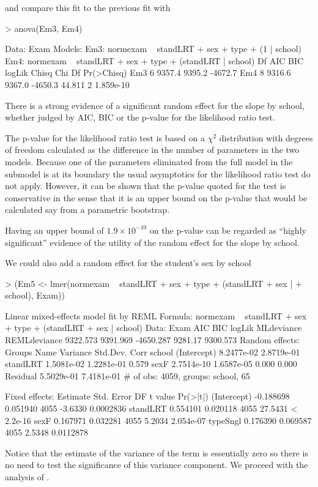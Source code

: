 \documentclass[12pt]{article}
\begin{document}
and compare this fit to the previous fit with
\begin{Schunk}
\begin{Sinput}
> anova(Em3, Em4)
\end{Sinput}
\begin{Soutput}
Data: Exam
Models:
Em3: normexam ~ standLRT + sex + type + (1 | school)
Em4: normexam ~ standLRT + sex + type + (standLRT | school)
    Df     AIC     BIC  logLik  Chisq Chi Df Pr(>Chisq)
Em3  6  9357.4  9395.2 -4672.7                         
Em4  8  9316.6  9367.0 -4650.3 44.811      2  1.859e-10
\end{Soutput}
\end{Schunk}
There is a strong evidence of a significant random effect for the
slope by school, whether judged by AIC, BIC or the p-value for the
likelihood ratio test.

The p-value for the likelihood ratio test is based on a $\chi^2$ distribution
with degrees of freedom calculated as the difference in the number of
parameters in the two models.  Because one of the parameters
eliminated from the full model in the submodel is at its boundary the
usual asymptotics for the likelihood ratio test do not apply.
However, it can be shown that the p-value quoted for the test is
conservative in the sense that it is an upper bound on the 
p-value that would be calculated say from a parametric bootstrap.

Having an upper bound of $1.9\times 10^{-10}$ on the p-value can be
regarded as ``highly significant'' evidence of the utility of the
random effect for the slope by school.

We could also add a random effect for the student's sex by school
\begin{Schunk}
\begin{Sinput}
> (Em5 <- lmer(normexam ~ standLRT + sex + type + (standLRT + sex | 
+     school), Exam))
\end{Sinput}
\begin{Soutput}
Linear mixed-effects model fit by REML
Formula: normexam ~ standLRT + sex + type + (standLRT + sex | school) 
   Data: Exam 
      AIC      BIC    logLik MLdeviance REMLdeviance
 9322.573 9391.969 -4650.287    9281.17     9300.573
Random effects:
 Groups   Name        Variance   Std.Dev.   Corr        
 school   (Intercept) 8.2477e-02 2.8719e-01             
          standLRT    1.5081e-02 1.2281e-01 0.579       
          sexF        2.7514e-10 1.6587e-05 0.000 0.000 
 Residual             5.5029e-01 7.4181e-01             
# of obs: 4059, groups: school, 65

Fixed effects:
               Estimate  Std. Error   DF t value  Pr(>|t|)
(Intercept)   -0.188698    0.051940 4055 -3.6330 0.0002836
standLRT       0.554101    0.020118 4055 27.5431 < 2.2e-16
sexF           0.167971    0.032281 4055  5.2034 2.054e-07
typeSngl       0.176390    0.069587 4055  2.5348 0.0112878
\end{Soutput}
\end{Schunk}
Notice that the estimate of the variance of the  term is
essentially zero so there is no need to test the significance of this
variance component.  We proceed with the analysis of .
\end{document}
